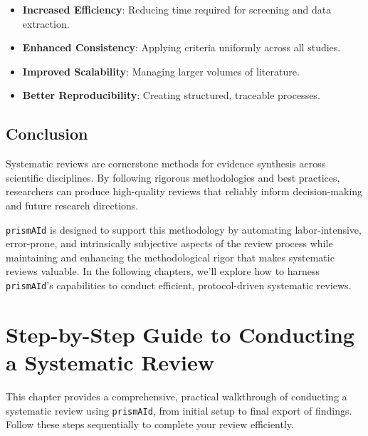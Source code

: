 \begin{itemize}
    \item \textbf{Increased Efficiency}: Reducing time required for screening and data extraction.
    \item \textbf{Enhanced Consistency}: Applying criteria uniformly across all studies.
    \item \textbf{Improved Scalability}: Managing larger volumes of literature.
    \item \textbf{Better Reproducibility}: Creating structured, traceable processes.
\end{itemize}

\section{Conclusion}

Systematic reviews are cornerstone methods for evidence synthesis across scientific disciplines. By following rigorous methodologies and best practices, researchers can produce high-quality reviews that reliably inform decision-making and future research directions.


\texttt{prismAId} is designed to support this methodology by automating labor-intensive, error-prone, and intrinsically subjective aspects of the review process while maintaining and enhancing the methodological rigor that makes systematic reviews valuable. In the following chapters, we'll explore how to harness \texttt{prismAId}'s capabilities to conduct efficient, protocol-driven systematic reviews.


\chapter[Step-by-Step to a Systematic Review]{Step-by-Step Guide to Conducting a Systematic Review} \label{chap:walkthrough}

This chapter provides a comprehensive, practical walkthrough of conducting a systematic review using \texttt{prismAId}, from initial setup to final export of findings. Follow these steps sequentially to complete your review efficiently.

